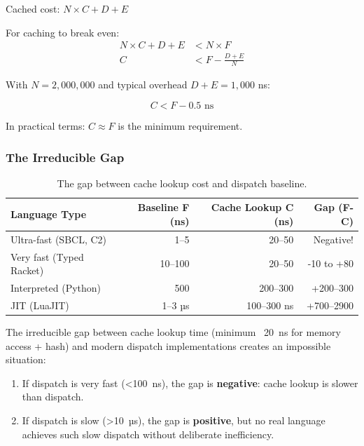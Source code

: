 \documentclass[sigplan,final]{acmart}
\begin{document}
Cached cost: $N \times C + D + E$

For caching to break even:
\begin{align}
N \times C + D + E &< N \times F \\
C &< F - \frac{D + E}{N}
\end{align}

With $N = 2,000,000$ and typical overhead $D + E = 1,000$ ns:

\begin{equation}
C < F - 0.5 \text{ ns}
\end{equation}

In practical terms: $C \approx F$ is the minimum requirement.

\subsubsection{The Irreducible Gap}

\begin{table}[h]
\centering
\caption{The gap between cache lookup cost and dispatch baseline.}
\label{tab:gap}
\begin{tabular}{@{}lrrr@{}}
\toprule
\textbf{Language Type} & \textbf{Baseline F (ns)} & \textbf{Cache Lookup C (ns)} & \textbf{Gap (F-C)} \\
\midrule
Ultra-fast (SBCL, C2) & 1--5 & 20--50 & Negative! \\
Very fast (Typed Racket) & 10--100 & 20--50 & -10 to +80 \\
Interpreted (Python) & 500 & 200--300 & +200--300 \\
JIT (LuaJIT) & 1--3 µs & 100--300 ns & +700--2900 \\
\bottomrule
\end{tabular}
\end{table}

The irreducible gap between cache lookup time (minimum ~20~ns for memory access + hash) and
modern dispatch implementations creates an impossible situation:

\begin{enumerate}
  \item If dispatch is very fast (<100~ns), the gap is \textbf{negative}: cache lookup is slower
    than dispatch.

  \item If dispatch is slow (>10~µs), the gap is \textbf{positive}, but no real language achieves
    such slow dispatch without deliberate inefficiency.
\end{enumerate}
\end{document}
